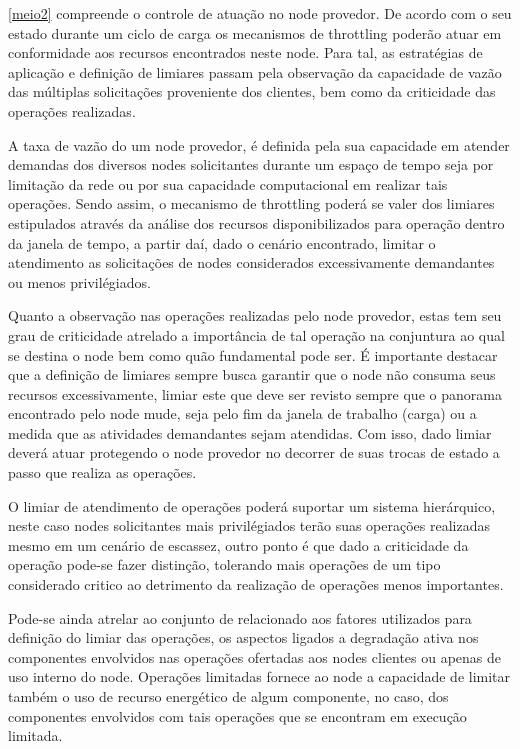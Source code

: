 \ref{meio2} compreende o controle de atuação no node provedor. De acordo com o seu estado durante um ciclo de carga os mecanismos de throttling poderão atuar em conformidade aos recursos encontrados neste node. Para tal, as estratégias de aplicação e definição de limiares passam pela observação da capacidade de vazão das múltiplas solicitações proveniente dos clientes, bem como da criticidade das operações realizadas. 

A taxa de vazão do um node provedor, é definida pela sua capacidade em atender demandas dos diversos nodes solicitantes durante um espaço de tempo seja por limitação da rede ou por sua capacidade computacional em realizar tais operações. Sendo assim, o mecanismo de throttling poderá se valer dos limiares estipulados através da análise dos recursos disponibilizados para operação dentro da janela de tempo, a partir daí, dado o cenário encontrado, limitar o atendimento as solicitações de nodes considerados excessivamente demandantes ou menos privilégiados.  

Quanto a observação nas operações realizadas pelo node provedor, estas tem seu grau de criticidade atrelado a importância de tal operação na conjuntura ao qual se destina o node bem como quão fundamental pode ser. É importante destacar que a definição de limiares sempre busca garantir que o node não consuma seus recursos excessivamente, limiar este que deve ser revisto sempre que o panorama encontrado pelo node mude, seja pelo fim da janela de trabalho (carga) ou a medida que as atividades demandantes sejam atendidas. Com isso, dado limiar deverá atuar protegendo o node provedor no decorrer de suas trocas de estado a passo que realiza as operações. 

O limiar de atendimento de operações poderá suportar um sistema hierárquico, neste caso nodes solicitantes mais privilégiados terão suas operações realizadas mesmo em um cenário de escassez, outro ponto é que dado a criticidade da operação pode-se fazer distinção, tolerando mais operações de um tipo considerado critico ao detrimento da realização de operações menos importantes.

Pode-se ainda atrelar ao conjunto de relacionado aos fatores utilizados para definição do limiar das operações, os aspectos ligados a degradação ativa nos componentes envolvidos nas operações ofertadas aos nodes clientes ou apenas de uso interno do node. Operações limitadas fornece ao node a capacidade de limitar também o uso de recurso energético de algum componente, no caso, dos componentes envolvidos com tais operações que se encontram em execução limitada. 

